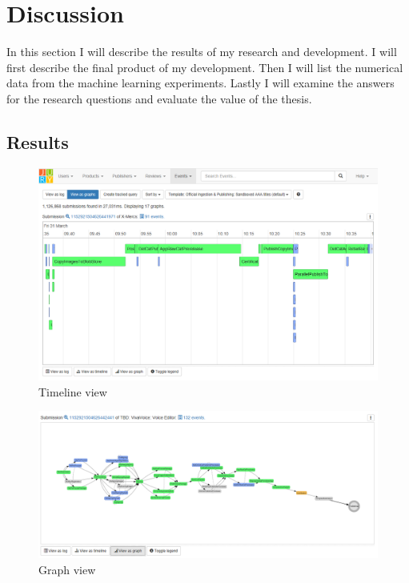 
\clearpage
\section{Discussion}
\label{sec:discussion}

In this section I will describe the results of my research and development.
I will first describe the final product of my development.
Then I will list the numerical data from the machine learning experiments.
Lastly I will examine the answers for the research questions and
evaluate the value of the thesis.

\subsection{Results}


\begin{figure}[htb]
\centering \includegraphics[width=\linewidth]{gfx/timeline.png}
\caption{Timeline view \label{fig:timeline}}
\end{figure}

\begin{figure}[htb]
\centering \includegraphics[width=\linewidth]{gfx/graph.png}
\caption{Graph view \label{fig:graph}}
\end{figure}


